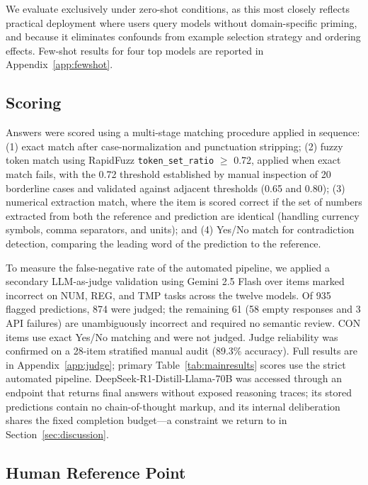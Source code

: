 We evaluate exclusively under zero-shot conditions, as this most closely reflects practical deployment where users query models without domain-specific priming, and because it eliminates confounds from example selection strategy and ordering effects. Few-shot results for four top models are reported in Appendix~\ref{app:fewshot}.

\subsection{Scoring}
\label{sec:scoring}

Answers were scored using a multi-stage matching procedure applied in sequence: (1) exact match after case-normalization and punctuation stripping; (2) fuzzy token match using RapidFuzz \texttt{token\_set\_ratio} $\geq$ 0.72, applied when exact match fails, with the 0.72 threshold established by manual inspection of 20 borderline cases and validated against adjacent thresholds (0.65 and 0.80); (3) numerical extraction match, where the item is scored correct if the set of numbers extracted from both the reference and prediction are identical (handling currency symbols, comma separators, and units); and (4) Yes/No match for contradiction detection, comparing the leading word of the prediction to the reference.

To measure the false-negative rate of the automated pipeline, we applied a secondary LLM-as-judge validation using Gemini 2.5 Flash over items marked incorrect on NUM, REG, and TMP tasks across the twelve models. Of 935 flagged predictions, 874 were judged; the remaining 61 (58 empty responses and 3 API failures) are unambiguously incorrect and required no semantic review. CON items use exact Yes/No matching and were not judged. Judge reliability was confirmed on a 28-item stratified manual audit (89.3\% accuracy). Full results are in Appendix~\ref{app:judge}; primary Table~\ref{tab:mainresults} scores use the strict automated pipeline. DeepSeek-R1-Distill-Llama-70B was accessed through an endpoint that returns final answers without exposed reasoning traces; its stored predictions contain no chain-of-thought markup, and its internal deliberation shares the fixed completion budget---a constraint we return to in Section~\ref{sec:discussion}.

\subsection{Human Reference Point}
\label{sec:humanbaseline}

